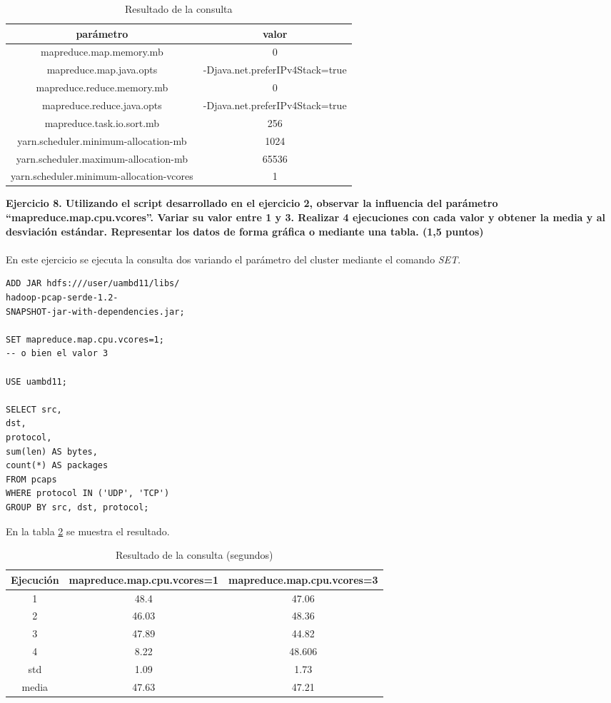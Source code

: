 \begin{table}[ht]
	\centering
	\caption{Resultado de la consulta}
	\begin{tabular}[t]{cc}
		parámetro & valor \\
		\hline
		mapreduce.map.memory.mb	& 0 \\
		mapreduce.map.java.opts&	-Djava.net.preferIPv4Stack=true\\
		mapreduce.reduce.memory.mb&	0\\
		mapreduce.reduce.java.opts&	-Djava.net.preferIPv4Stack=true\\
		mapreduce.task.io.sort.mb	&256\\
		 yarn.scheduler.minimum-allocation-mb	& 1024 \\
		yarn.scheduler.maximum-allocation-mb&	65536\\
		yarn.scheduler.minimum-allocation-vcores&	1
	\end{tabular}
	\label{tab:c7}
\end{table}%
\textbf{Ejercicio 8. Utilizando el script desarrollado en el ejercicio 2, observar la influencia del parámetro
	“mapreduce.map.cpu.vcores”. Variar su valor entre 1 y 3. Realizar 4 ejecuciones con cada valor y
	obtener la media y al desviación estándar. Representar los datos de forma gráfica o mediante
	una tabla. (1,5 puntos)}\\\\
En este ejercicio se ejecuta la consulta dos variando el parámetro del cluster mediante el comando \textit{SET}.
\begin{lstlisting}[caption=Consulta para obtener el registro de flujos (ampliado)]
ADD JAR hdfs:///user/uambd11/libs/
hadoop-pcap-serde-1.2-
SNAPSHOT-jar-with-dependencies.jar;

SET mapreduce.map.cpu.vcores=1;
-- o bien el valor 3

USE uambd11;

SELECT src,
dst, 
protocol,
sum(len) AS bytes,
count(*) AS packages 
FROM pcaps
WHERE protocol IN ('UDP', 'TCP')
GROUP BY src, dst, protocol;
\end{lstlisting}
En la tabla \ref{tab:c8} se muestra el resultado.
\begin{table}[ht]
	\centering
	\caption{Resultado de la consulta (segundos)}
	\begin{tabular}[t]{ccc}
		Ejecución & mapreduce.map.cpu.vcores=1 & mapreduce.map.cpu.vcores=3 \\
		\hline

		1&48.4&	47.06\\
		2&46.03&	48.36\\
		3&47.89&	44.82\\
		4&8.22&	48.606\\
\hline
std &1.09&	1.73
\\
media &47.63 & 47.21

	\end{tabular}
	\label{tab:c8}
\end{table}%
